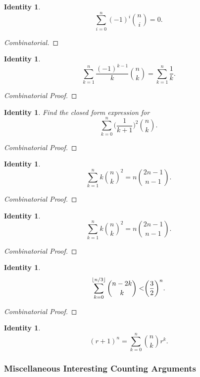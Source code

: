 \documentclass[12]{article}
\DeclarePairedDelimiter\floor{\lfloor}{\rfloor}
\newcounter{identityCounter}
\newtheorem{iden}[identityCounter]{Identity}
\theoremstyle{definition}
\begin{document}
	\begin{iden}
		$$\sum_{i=0}^n (-1)^i{n \choose i} = 0.$$
	\end{iden}
	\begin{proof}[Combinatorial]
	
	\end{proof}
	
	\begin{iden}
		$$\sum_{k=1}^n \frac{(-1)^{k-1}}{k} {n \choose k} = \sum_{k=1}^n \frac{1}{k}.$$
	\end{iden}
	\begin{proof}[Combinatorial Proof]
		
	\end{proof}

	

	\begin{iden}
		Find the closed form expression for
		$$\sum_{k=0}^n \biggr(\frac{1}{k+1} \biggr)^2 { n \choose k} .$$
	\end{iden}
	\begin{proof}[Combinatorial Proof]
		
	\end{proof}

	\begin{iden}
		$$\sum_{k=1}^n k{n \choose k}^2 = n{2n - 1 \choose n-1}.$$
	\end{iden}
	\begin{proof}[Combinatorial Proof]
		
	\end{proof}

	\begin{iden}
		$$\sum_{k=1}^n k{n \choose k}^2 = n{2n - 1 \choose n-1}.$$
	\end{iden}
	\begin{proof}[Combinatorial Proof]
		
	\end{proof}	
	
	\begin{iden}
		$$\sum_{k=0}^{\floor{n/3}} {n - 2k \choose k} < \biggr( \frac{3}{2} \biggr)^n.$$
	\end{iden}
	\begin{proof}[Combinatorial Proof]
		
	\end{proof}

	\begin{iden}
		$$(r+1)^n = \sum_{k=0}^n {n \choose k}r^k.$$
	\end{iden}
	
	\subsubsection{Miscellaneous Interesting Counting Arguments}
	
\end{document}
